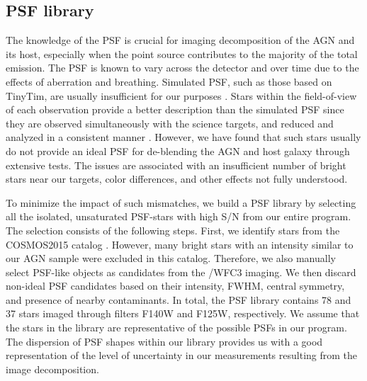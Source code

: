 \documentclass[apj]{emulateapj}
\begin{document}

 
\subsection{PSF library}
\label{sec:psf_library}

The knowledge of the PSF is crucial for imaging decomposition of the AGN and its host, especially when the point source contributes to the majority of the total emission. The PSF is known to vary across the detector and over time due to the effects of aberration and breathing. Simulated PSF, such as those based on {\sc TinyTim}, are usually insufficient for our purposes \citep{Mechtley2012}. Stars within the field-of-view of each observation provide a better description than the simulated PSF since they are observed simultaneously with the science targets, and reduced and analyzed in a consistent manner \citet{Kim2008, Park15}. However, we have found that such stars usually do not provide an ideal PSF for de-blending the AGN and host galaxy through extensive tests. The issues are associated with an insufficient number of bright stars near our targets, color differences, and other effects not fully understood.

To minimize the impact of such mismatches, we build a PSF library by selecting all the isolated, unsaturated PSF-stars with high S/N from our entire program. The selection consists of the following steps. First, we identify stars from the COSMOS2015 catalog \citep{Laigle2016}. However, many bright stars with an intensity similar to our AGN sample were excluded in this catalog. Therefore, we also manually select PSF-like objects as candidates from the \hst/WFC3 imaging. We then discard non-ideal PSF candidates based on their intensity, FWHM, central symmetry, and presence of nearby contaminants. In total, the PSF library contains 78 and 37 stars imaged through filters F140W and F125W, respectively. We assume that the stars in the library are representative of the possible PSFs in our program. The dispersion of PSF shapes within our library provides us with a good representation of the level of uncertainty in our measurements resulting from the image decomposition.
\end{document}

